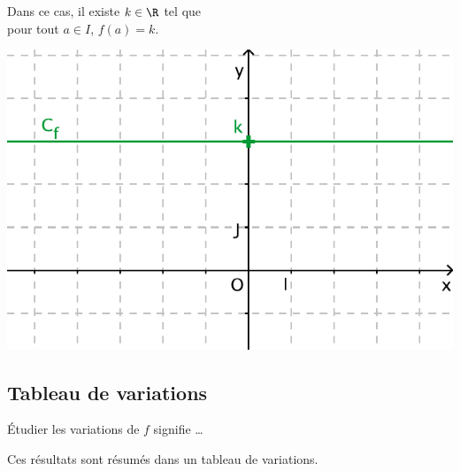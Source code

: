 \begin{minipage}[t]{0.4\linewidth}
  Dans ce cas, il existe $k\in\R$ tel que \\ pour tout $a\in I$, $f(a)=k$.
\end{minipage}
\qquad
\begin{minipage}[c]{0.4\linewidth}
  \includegraphics[width=\textwidth]{F_Constante.pdf}
\end{minipage}



\subsection{Tableau de variations}

\og Étudier les variations de $f$ \fg{} signifie {\ldots}



Ces résultats sont résumés dans un tableau de variations. \\


